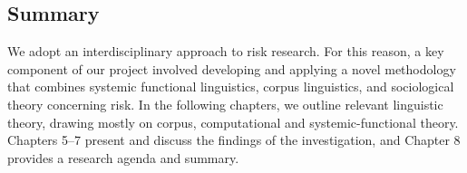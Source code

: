 \subsection{Summary}

We adopt an interdisciplinary approach to risk research. For this reason, a key component of our project involved developing and applying a novel methodology that combines systemic functional linguistics, corpus linguistics, and sociological theory concerning risk. In the following chapters, we outline relevant linguistic theory, drawing mostly on corpus, computational and systemic-functional theory. Chapters 5--7 present and discuss the findings of the investigation, and Chapter 8 provides a research agenda and summary.


